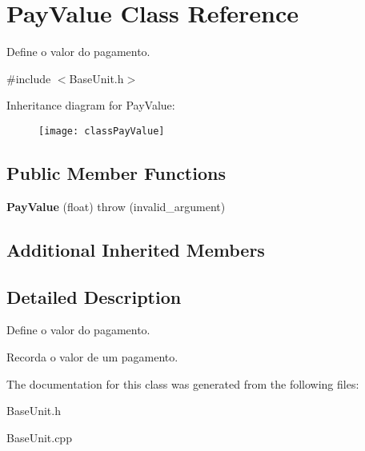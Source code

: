 \hypertarget{classPayValue}{\section{Pay\-Value Class Reference}
\label{classPayValue}
}


Define o valor do pagamento.  




{\ttfamily \#include $<$Base\-Unit.\-h$>$}

Inheritance diagram for Pay\-Value\-:\begin{figure}[H]
\begin{center}
\leavevmode
\texttt{[image: classPayValue]}
\end{center}
\end{figure}
\subsection*{Public Member Functions}
\begin{DoxyCompactItemize}
\item 
\hypertarget{classPayValue_a94fd7f5521beb8a47dbd34e6e0671a11}{{\bfseries Pay\-Value} (float)  throw (invalid\-\_\-argument)}\label{classPayValue_a94fd7f5521beb8a47dbd34e6e0671a11}

\end{DoxyCompactItemize}
\subsection*{Additional Inherited Members}


\subsection{Detailed Description}
Define o valor do pagamento. 

Recorda o valor de um pagamento. 

The documentation for this class was generated from the following files\-:\begin{DoxyCompactItemize}
\item 
Base\-Unit.\-h\item 
Base\-Unit.\-cpp\end{DoxyCompactItemize}
